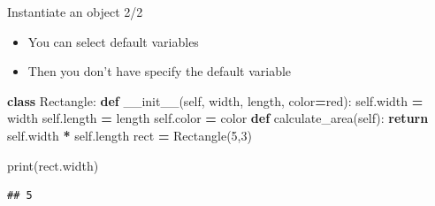 \documentclass[
  8pt,
  ignorenonframetext,
]{beamer}
\newenvironment{Shaded}{\begin{snugshade}}{\end{snugshade}}
\newcommand{\BuiltInTok}[1]{#1}
\newcommand{\ControlFlowTok}[1]{\textcolor[rgb]{0.13,0.29,0.53}{\textbf{#1}}}
\newcommand{\DecValTok}[1]{\textcolor[rgb]{0.00,0.00,0.81}{#1}}
\newcommand{\FunctionTok}[1]{\textcolor[rgb]{0.00,0.00,0.00}{#1}}
\newcommand{\KeywordTok}[1]{\textcolor[rgb]{0.13,0.29,0.53}{\textbf{#1}}}
\newcommand{\NormalTok}[1]{#1}
\newcommand{\OperatorTok}[1]{\textcolor[rgb]{0.81,0.36,0.00}{\textbf{#1}}}
\newcommand{\StringTok}[1]{\textcolor[rgb]{0.31,0.60,0.02}{#1}}
\newcommand{\VariableTok}[1]{\textcolor[rgb]{0.00,0.00,0.00}{#1}}
\begin{document}
\begin{frame}[fragile]{Instantiate an object 2/2}
\protect\hypertarget{instantiate-an-object-22}{}
\begin{itemize}
\item
  You can select default variables
\item
  Then you don't have specify the default variable
\end{itemize}

\begin{Shaded}
\begin{Highlighting}[]
\KeywordTok{class}\NormalTok{ Rectangle:}
    \KeywordTok{def} \FunctionTok{\_\_init\_\_}\NormalTok{(}\VariableTok{self}\NormalTok{, width, length, color}\OperatorTok{=}\StringTok{\textquotesingle{}red\textquotesingle{}}\NormalTok{):}
        \VariableTok{self}\NormalTok{.width }\OperatorTok{=}\NormalTok{ width}
        \VariableTok{self}\NormalTok{.length }\OperatorTok{=}\NormalTok{ length}
        \VariableTok{self}\NormalTok{.color }\OperatorTok{=}\NormalTok{ color}
    \KeywordTok{def}\NormalTok{ calculate\_area(}\VariableTok{self}\NormalTok{):}
      \ControlFlowTok{return} \VariableTok{self}\NormalTok{.width }\OperatorTok{*} \VariableTok{self}\NormalTok{.length}
\NormalTok{rect }\OperatorTok{=}\NormalTok{ Rectangle(}\DecValTok{5}\NormalTok{,}\DecValTok{3}\NormalTok{)}

\BuiltInTok{print}\NormalTok{(rect.width)}
\end{Highlighting}
\end{Shaded}

\begin{verbatim}
## 5
\end{verbatim}
\end{frame}
\end{document}
